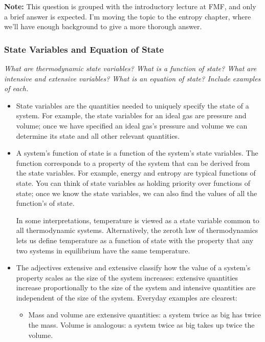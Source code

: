 \documentclass[11pt, a4paper]{article}
\begin{document}
\textbf{Note:} This question is grouped with the introductory lecture at FMF, and only a brief answer is expected. I'm moving the topic to the entropy chapter, where we'll have enough background to give a more thorough answer.



\subsubsection{State Variables and Equation of State} \label{sss:td:eq_state}
\textit{What are thermodynamic state variables? What is a function of state? What are intensive and extensive variables? What is an equation of state? Include examples of each.}
\begin{itemize}
	\item State variables are the quantities needed to uniquely specify the state of a system. For example, the state variables for an ideal gas are pressure and volume; once we have specified an ideal gas's pressure and volume we can determine its state and all other relevant quantities. 
	
	\item A system's function of state is a function of the system's state variables. The function corresponds to a property of the system that can be derived from the state variables. For example, energy and entropy are typical functions of state. You can think of state variables as holding priority over functions of state; once we know the state variables, we can also find the values of all the function's of state.
	
	In some interpretations, temperature is viewed as a state variable common to all thermodynamic systems. Alternatively, the zeroth law of thermodynamics lets us define temperature as a function of state with the property that any two systems in equilibrium have the same temperature.
	
	\item The adjectives extensive and extensive classify how the value of a system's property scales as the size of the system increases: extensive quantities increase proportionally to the size of the system and intensive quantities are independent of the size of the system. Everyday examples are clearest:
	\begin{itemize}
		\item Mass and volume are extensive quantities: a system twice as big has twice the mass. Volume is analogous: a system twice as big takes up twice the volume.
		

\end{itemize}
\end{itemize}
\end{document}
